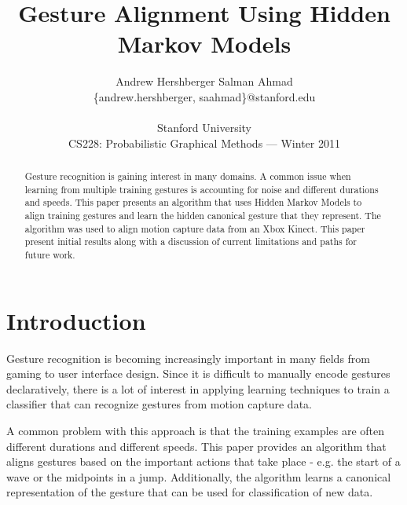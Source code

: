 \documentclass{article}
\title{Gesture Alignment Using Hidden Markov Models}
\author{
Andrew Hershberger
\quad Salman Ahmad \\
\{andrew.hershberger, saahmad\}@stanford.edu
\\\\
Stanford University\\
CS228: Probabilistic Graphical Methods --- Winter 2011\\
}
\begin{document}
\maketitle

\begin{abstract}

Gesture recognition is gaining interest in many domains. A common issue when
learning from multiple training gestures is accounting for noise and different
durations and speeds. This paper presents an algorithm that uses Hidden Markov
Models to align training gestures and learn the hidden canonical gesture that
they represent. The algorithm was used to align motion capture data from an
Xbox Kinect. This paper present initial results along with a discussion of
current limitations and paths for future work.

\end{abstract}

\section{Introduction}

Gesture recognition is becoming increasingly important in many fields from
gaming to user interface design. Since it is difficult to manually encode
gestures declaratively, there is a lot of interest in applying learning
techniques to train a classifier that can recognize gestures from motion
capture data.

A common problem with this approach is that the training examples are often
different durations and different speeds. This paper provides an algorithm
that aligns gestures based on the important actions that take place - e.g. the
start of a wave or the midpoints in a jump. Additionally, the algorithm
learns a canonical representation of the gesture that can be used for
classification of new data.
\end{document}
